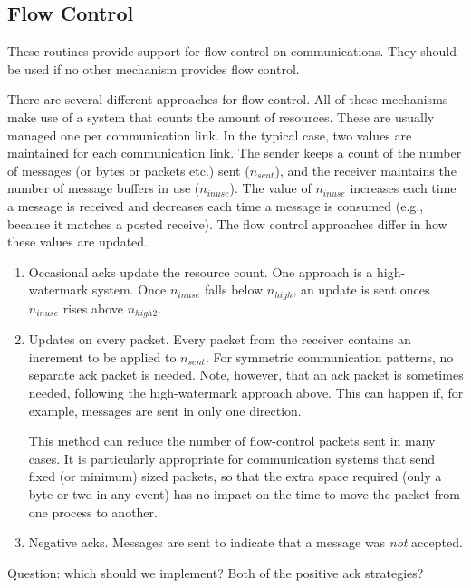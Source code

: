 \documentclass[dvipdfm]{article}
\begin{document}
\subsection{Flow Control}
\label{sec:flow-control}
These routines provide support for flow control on communications.
They should be used if no other mechanism provides flow control.

\makeussubscript
There are several different approaches for flow control.  All of these
mechanisms make use of a system that counts the amount of resources.
These are usually managed one per communication link.  In the typical
case, two values are maintained for each communication link.  The
sender keeps a count of the number of messages (or bytes or packets
etc.) sent ($n_{sent}$), and the receiver maintains the number of
message buffers 
in use ($n_{inuse}$).  The value of $n_{inuse}$ increases each time a
message is received and decreases each time a message is consumed
(e.g., because it matches a posted receive). 
The flow control approaches differ in how these values are updated. 

\begin{enumerate}
\item Occasional acks update the resource count.  One approach is a
high-watermark system.  Once $n_{inuse}$ falls below $n_{high}$, an
update is sent onces $n_{inuse}$ rises above $n_{high2}$. 

\item Updates on every packet.  Every packet from the receiver
contains an increment to be applied to $n_{sent}$.  For symmetric
communication patterns, no separate ack packet is needed.  Note,
however, that an ack packet is sometimes needed, following the
high-watermark approach above.  This can happen if, for example,
messages are sent in only one direction.  

This method can reduce the number of flow-control packets sent in many
cases.  It is particularly appropriate for communication systems that
send fixed (or minimum) sized packets, so that the extra space
required (only a byte or two in any event) has no impact on the time
to move the packet from one process to another.  

\item Negative acks.  Messages are sent to indicate that a message was
\emph{not} accepted. 

\end{enumerate}
\makeustext

Question: which should we implement?  Both of the positive ack
strategies? 
\end{document}
